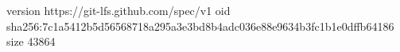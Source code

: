 version https://git-lfs.github.com/spec/v1
oid sha256:7c1a5412b5d56568718a295a3e3bd8b4adc036e88e9634b3fc1b1e0dffb64186
size 43864
